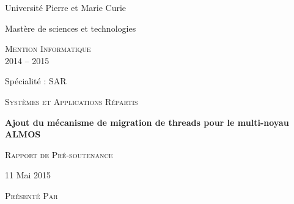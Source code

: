 \begin{titlepage}  

  {\begin{center}\huge\textsf{Université Pierre et Marie Curie}\end{center}}


  \vspace{0.4cm}
  

  {\begin{center}\huge\textsf{Mastère de sciences et technologies}\end{center}}
  
  \vspace{0.4cm}
  
  {\begin{center}\huge\textsc{Mention Informatique \\2014 -- 2015} \end{center}}
  
  \vspace{0.4cm}
  
  {\begin{center}\huge\textsf{Spécialité : SAR}\end{center}}
  
  {\begin{center}\large\textsc{Systèmes et Applications Répartis }\end{center}}
  
  \vspace{0.4cm}

  {\begin{center}\Huge\textbf{Ajout du mécanisme de migration de threads pour le
        multi-noyau ALMOS}\end{center}}
  
  \vspace{0.4cm}
  
  {\begin{center}\huge\textsc{Rapport de Pré-soutenance}\end{center}}
  
  \vspace{0.4cm}
  
  {\begin{center}\large\textsf {11 Mai 2015 }\end{center}}
  
  \vspace{0.4cm}
  
  {\begin{center}\Large\textsc{Présenté Par}\end{center}}
  

\end{titlepage}
